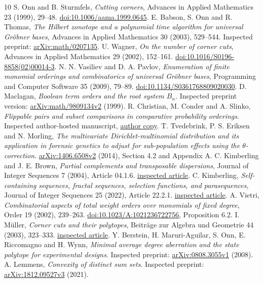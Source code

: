 \documentclass[11pt,a4paper]{article}
\theoremstyle{remark}\newtheorem{remark}[theorem]{Remark}
\begin{document}
\begin{thebibliography}{10}
 S. Onn and B. Sturmfels,
\emph{Cutting corners}, Advances in Applied Mathematics 23 (1999),
29--48. \href{https://doi.org/10.1006/aama.1999.0645}{doi:10.1006/aama.1999.0645}.
 E. Babson, S. Onn and R. Thomas,
\emph{The Hilbert zonotope and a polynomial time algorithm for
universal Gr\"obner bases}, Advances in Applied Mathematics 30 (2003),
529--544. Inspected preprint:
\href{https://arxiv.org/abs/math/0207135}{arXiv:math/0207135}.
 U. Wagner, \emph{On the number of corner cuts},
Advances in Applied Mathematics 29 (2002), 152--161.
\href{https://doi.org/10.1016/S0196-8858(02)00014-3}{doi:10.1016/S0196-8858(02)00014-3}.
 N. N. Vasiliev and D. A. Pavlov,
\emph{Enumeration of finite monomial orderings and combinatorics
of universal Gr\"obner bases}, Programming and Computer Software
35 (2009), 79--89.
\href{https://doi.org/10.1134/S0361768809020030}{doi:10.1134/S0361768809020030}.
 D. Maclagan,
\emph{Boolean term orders and the root system \(B_n\)}.
Inspected preprint version:
\href{https://arxiv.org/abs/math/9809134}{arXiv:math/9809134v2} (1999).
 R. Christian, M. Conder and A. Slinko,
\emph{Flippable pairs and subset comparisons in comparative
probability orderings}. Inspected author-hosted manuscript,
\href{https://www.math.auckland.ac.nz/~slinko/Research/isipta17.pdf}{author copy}.
 T. Tvedebrink, P. S. Eriksen and N. Morling,
\emph{The multivariate Dirichlet-multinomial distribution and its
application in forensic genetics to adjust for sub-population
effects using the \(\theta\)-correction}.
\href{https://arxiv.org/abs/1406.6508}{arXiv:1406.6508v2} (2014),
Section 4.2 and Appendix A.
 C. Kimberling and J. E. Brown,
\emph{Partial complements and transposable dispersions},
Journal of Integer Sequences 7 (2004), Article 04.1.6.
\href{https://cs.uwaterloo.ca/journals/JIS/VOL7/Kimberling/kimber67.pdf}{inspected article}.
 C. Kimberling,
\emph{Self-containing sequences, fractal sequences,
selection functions, and parasequences},
Journal of Integer Sequences 25 (2022), Article 22.2.1.
\href{https://cs.uwaterloo.ca/journals/JIS/VOL25/Kimberling/kimber16.pdf}{inspected article}.
 A. Vietri,
\emph{Combinatorial aspects of total weight orders over monomials
of fixed degree}, Order 19 (2002), 239--263.
\href{https://doi.org/10.1023/A:1021236722756}{doi:10.1023/A:1021236722756},
Proposition 6.2.
 I. M\"uller, \emph{Corner cuts and their polytopes},
Beitr\"age zur Algebra und Geometrie 44 (2003), 323--333.
\href{https://ftp.gwdg.de/pub/misc/EMIS/journals/BAG/vol.44/no.2/3.html}{inspected article}.
 Y. Berstein, H. Maruri-Aguilar, S. Onn,
E. Riccomagno and H. Wynn,
\emph{Minimal average degree aberration and the state polytope
for experimental designs}. Inspected preprint:
\href{https://arxiv.org/abs/0808.3055}{arXiv:0808.3055v1} (2008).
 A. Lemmens, \emph{Convexity of distinct sum sets}.
Inspected preprint:
\href{https://arxiv.org/abs/1812.09527}{arXiv:1812.09527v3} (2021).
\end{thebibliography}
\end{document}
